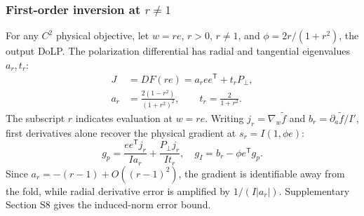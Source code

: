 \documentclass[pdflatex,sn-mathphys-num]{sn-jnl}
\begin{document}
\subsubsection{First-order inversion at $r\ne1$}
For any $C^2$ physical objective, let $w=re$, $r>0$, $r\ne1$, and $\phi=2r/(1+r^2)$, the output DoLP. The polarization differential has radial and tangential eigenvalues $a_r,t_r$:
\begin{equation}
 \begin{aligned}
 J&=DF(re)=a_ree^{\mathsf T}+t_rP_\perp,\\
 a_r&=\frac{2(1-r^2)}{(1+r^2)^2},\qquad t_r=\frac2{1+r^2}.
 \end{aligned}
 \label{eq:nearjacobian}
\end{equation}
The subscript $r$ indicates evaluation at $w=re$. Writing $j_r=\nabla_w\widetilde f$ and $b_r=\partial_a\widetilde f/I'$, first derivatives alone recover the physical gradient at $s_r=I(1,\phi e)$:
\begin{equation}
 g_p=\frac{ee^{\mathsf T}j_r}{Ia_r}+\frac{P_\perp j_r}{It_r},\quad
 g_I=b_r-\phi e^{\mathsf T}g_p.
 \label{eq:firstinverse}
\end{equation}
Since $a_r=-(r-1)+O((r-1)^2)$, the gradient is identifiable away from the fold, while radial derivative error is amplified by $1/(I|a_r|)$. Supplementary Section S8 gives the induced-norm error bound.
\end{document}
